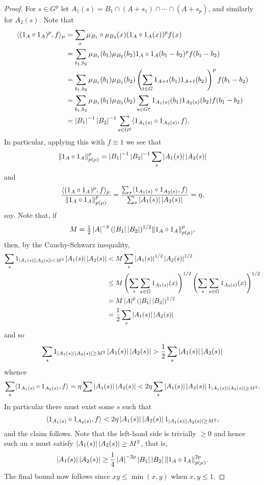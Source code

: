 \begin{proof}
For $s\in G^{p}$ let $A_1(s)=B_1\cap (A+s_1)\cap\cdots\cap (A+s_{p})$, and similarly for $A_2(s)$. Note that
\begin{align*}
\langle (1_{A}\circ 1_{A})^p, f\rangle_\mu
&=\sum_{x} \mu_{B_1}\circ \mu_{B_2}(x)(1_{A}\circ 1_{A}(x))^pf(x)\\
&=\sum_{b_1,b_2}\mu_{B_1}(b_1)\mu_{B_2}(b_2)1_{A}\circ 1_{A}(b_1-b_2)^{p}f(b_1-b_2)\\
&=\sum_{b_1,b_2}\mu_{B_1}(b_1)\mu_{B_2}(b_2)\left( \sum_{t\in G}1_{A+t}(b_1)1_{A+t}(b_2)\right)^{p}f(b_1-b_2)\\
&=\sum_{b_1,b_2}\mu_{B_1}(b_1)\mu_{B_2}(b_2)\sum_{s\in G^p}1_{A_1(s)}(b_1)1_{A_2(s)}(b_2)f(b_1-b_2)\\
&=\left\lvert B_1\right\rvert^{-1}\left\lvert B_2\right\rvert^{-1}\sum_{s\in G^p}\langle 1_{A_1(s)}\circ 1_{A_2(s)}, f\rangle.
\end{align*}
In particular, applying this with $f\equiv 1$ we see that
\[\lVert 1_{A}\circ 1_{A}\rVert_{p(\mu)}^p=\left\lvert B_1\right\rvert^{-1}\left\lvert B_2\right\rvert^{-1}\sum_s\left\lvert A_1(s)\right\rvert\left\lvert A_2(s)\right\rvert\]
and
\[\frac{\langle (1_{A}\circ 1_{A})^p,f\rangle_\mu}{\lVert 1_{A}\circ 1_{A}\rVert_{p(\mu)}^p}=\frac{\sum_{s}\langle 1_{A_1(s)}\circ 1_{A_2(s)}, f\rangle}{\sum_s \left\lvert A_1(s)\right\rvert\left\lvert A_2(s)\right\rvert}=\eta,\]
say. Note that, if
\[M=\tfrac{1}{2}\left\lvert A\right\rvert^{-p}(\left\lvert B_1\right\rvert\left\lvert B_2\right\rvert)^{1/2}\lVert 1_{A}\circ 1_{A}\rVert_{p(\mu)}^p,\]
then, by the Cauchy-Schwarz inequality,
\begin{align*}
\sum_s 1_{\left\lvert A_1(s)\right\rvert\left\lvert A_2(s)\right\rvert<M^2}\left\lvert A_1(s)\right\rvert\left\lvert A_2(s)\right\rvert
&< M \sum_s \left\lvert A_1(s)\right\rvert^{1/2}\left\lvert A_2(s)\right\rvert^{1/2}\\
&\leq M\left( \sum_s \sum_{x\in G}1_{A_1(s)}(x)\right)^{1/2}\left( \sum_s \sum_{x\in G}1_{A_2(s)}(x)\right)^{1/2}\\
&= M\left\lvert A\right\rvert^p(\left\lvert B_1\right\rvert\left\lvert B_2\right\rvert)^{1/2}\\
&=\frac{1}{2}\sum_s \left\lvert A_1(s)\right\rvert\left\lvert A_2(s)\right\rvert
\end{align*}
and so
\[
\sum_s 1_{\left\lvert A_1(s)\right\rvert\left\lvert A_2(s)\right\rvert\geq M^2}\left\lvert A_1(s)\right\rvert\left\lvert A_2(s)\right\rvert
> \frac{1}{2}\sum_s \left\lvert A_1(s)\right\rvert\left\lvert A_2(s)\right\rvert\]
whence
\[\sum_s\langle 1_{A_1(s)}\circ 1_{A_2(s)},f\rangle =\eta \sum \left\lvert A_1(s)\right\rvert\left\lvert A_2(s)\right\rvert
< 2\eta \sum_s \left\lvert A_1(s)\right\rvert\left\lvert A_2(s)\right\rvert1_{\left\lvert A_1(s)\right\rvert\left\lvert A_2(s)\right\rvert\geq M^2}.\]
In particular there must exist some $s$ such that
\[\langle 1_{A_1(s)}\circ 1_{A_2(s)},f\rangle< 2\eta \left\lvert A_1(s)\right\rvert\left\lvert A_2(s)\right\rvert1_{\left\lvert A_1(s)\right\rvert\left\lvert A_2(s)\right\rvert\geq M^2},\]
and the claim follows. Note that the left-hand side is trivially $\geq 0$ and hence such an $s$ must satisfy $ \left\lvert A_1(s)\right\rvert\left\lvert A_2(s)\right\rvert\geq M^2$, that is,
\[\left\lvert A_1(s)\right\rvert\left\lvert A_2(s)\right\rvert\geq \frac{1}{4}\left\lvert A\right\rvert^{-2p}\left\lvert B_1\right\rvert\left\lvert B_2\right\rvert\lVert 1_{A}\circ 1_{A}\rVert_{p(\mu)}^{2p}.\]
The final bound now follows since $xy \leq \min(x,y)$ when $x,y\leq 1$.
\end{proof}


